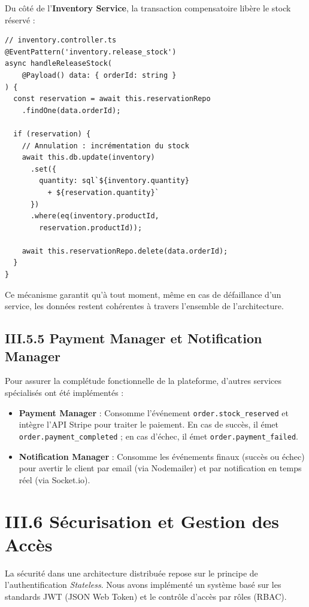 Du côté de l'\textbf{Inventory Service}, la transaction compensatoire lib\`ere le stock r\'eserv\'e :

\begin{verbatim}
// inventory.controller.ts
@EventPattern('inventory.release_stock')
async handleReleaseStock(
    @Payload() data: { orderId: string }
) {
  const reservation = await this.reservationRepo
    .findOne(data.orderId);

  if (reservation) {
    // Annulation : incrémentation du stock
    await this.db.update(inventory)
      .set({
        quantity: sql`${inventory.quantity}
          + ${reservation.quantity}`
      })
      .where(eq(inventory.productId,
        reservation.productId));

    await this.reservationRepo.delete(data.orderId);
  }
}
\end{verbatim}

Ce m\'ecanisme garantit qu'\`a tout moment, même en cas de d\'efaillance d'un service, les donn\'ees restent coh\'erentes à travers l'ensemble de l'architecture.

\subsection{III.5.5 Payment Manager et Notification Manager}
Pour assurer la compl\'etude fonctionnelle de la plateforme, d'autres services sp\'ecialis\'es ont \'et\'e impl\'ement\'es :
\begin{itemize}
    \item \textbf{Payment Manager} : Consomme l'\'ev\'enement \texttt{order.stock\_reserved} et int\`egre l'API Stripe pour traiter le paiement. En cas de succ\`es, il \'emet \texttt{order.payment\_completed} ; en cas d'\'echec, il \'emet \texttt{order.payment\_failed}.
    \item \textbf{Notification Manager} : Consomme les \'ev\'enements finaux (succ\`es ou \'echec) pour avertir le client par email (via Nodemailer) et par notification en temps r\'eel (via Socket.io).
\end{itemize}

\section{III.6 Sécurisation et Gestion des Accès}
\label{sec:security_impl}

La sécurité dans une architecture distribuée repose sur le principe de l'authentification \textit{Stateless}. Nous avons implémenté un système basé sur les standards JWT (JSON Web Token) et le contrôle d'accès par rôles (RBAC).

